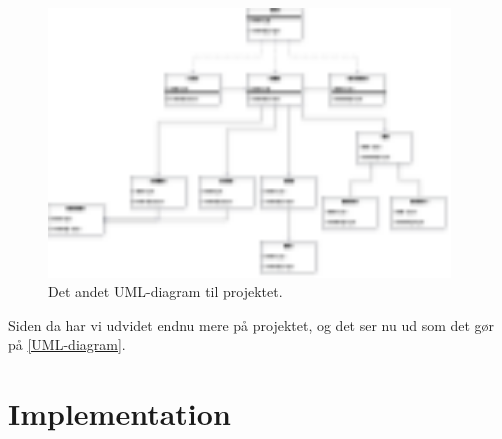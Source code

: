 \documentclass{article}
\theoremstyle{mytheoremstyle}
\theoremstyle{mytheoremstyle}
\theoremstyle{myproblemstyle}
\begin{document}
\begin{figure}[H]
    \begin{center}
        \includegraphics[width=0.95\textwidth]{figures/UML-diagram-old2.png}
    \end{center}
    \caption{Det andet UML-diagram til projektet.}
    \label{UML-diagram-old2}
\end{figure}
Siden da har vi udvidet endnu mere på projektet, og det ser nu ud som det gør på
\autoref{UML-diagram}.


\section{Implementation}\label{sec:Implementation} %
\end{document}
